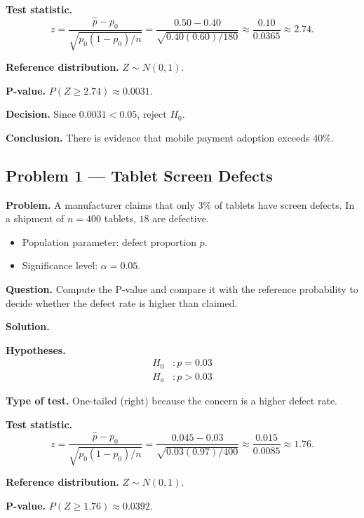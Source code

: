 	\textbf{Test statistic.}
	\[
	z = \frac{\hat{p}-p_0}{\sqrt{p_0(1-p_0)/n}} = \frac{0.50-0.40}{\sqrt{0.40(0.60)/180}} \approx \frac{0.10}{0.0365} \approx 2.74.
	\]
	
	\textbf{Reference distribution.} $Z \sim N(0,1)$.
	
	\textbf{P-value.} $P(Z\ge 2.74)\approx 0.0031$.
	
	\textbf{Decision.} Since $0.0031<0.05$, reject $H_0$.
	
	\textbf{Conclusion.} There is evidence that mobile payment adoption exceeds $40\%$.
	
	
	\hypertarget{c7-ex1}{}
	\subsection*{Problem 1 — Tablet Screen Defects}
	
	\textbf{Problem.} A manufacturer claims that only $3\%$ of tablets have screen defects. In a shipment of $n=400$ tablets, $18$ are defective.
	\begin{itemize}
		\item Population parameter: defect proportion $p$.
		\item Significance level: $\alpha=0.05$.
	\end{itemize}
	
	\textbf{Question.} Compute the P-value and compare it with the reference probability to decide whether the defect rate is higher than claimed.
	
	\textbf{Solution.}
	
	\textbf{Hypotheses.}
	\[
	\begin{aligned}
		H_0&: p = 0.03 \\
		H_a&: p > 0.03
	\end{aligned}
	\]
	
	\textbf{Type of test.} One-tailed (right) because the concern is a higher defect rate.
	
	\textbf{Test statistic.}
	\[
	z = \frac{\hat{p}-p_0}{\sqrt{p_0(1-p_0)/n}} = \frac{0.045-0.03}{\sqrt{0.03(0.97)/400}} \approx \frac{0.015}{0.0085} \approx 1.76.
	\]
	
	\textbf{Reference distribution.} $Z \sim N(0,1)$.
	
	\textbf{P-value.} $P(Z\ge 1.76)\approx 0.0392$.
	
